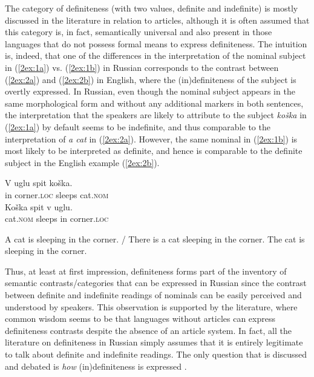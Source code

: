 \documentclass[output=paper]{langsci/langscibook}
\begin{document}
The category of definiteness (with two values, definite and indefinite) is mostly discussed in the literature in relation to articles, although it is often assumed that this category is, in fact, semantically universal and also present in those languages that do not possess formal means to express definiteness. The intuition is, indeed, that one of the differences in the interpretation of the nominal subject in (\ref{2ex:1a}) vs. (\ref{2ex:1b}) in Russian corresponds to the contrast between (\ref{2ex:2a}) and (\ref{2ex:2b}) in English, where the (in)definiteness of the subject is overtly expressed. In Russian, even though the nominal subject appears in the same morphological form and without any additional markers in both sentences, the interpretation that the speakers are likely to attribute to the subject {\emph{ko\v{s}ka}} in (\ref{2ex:1a}) by default seems to be indefinite, and thus comparable to the interpretation of {\emph{a cat}} in (\ref{2ex:2a}). However, the same nominal in (\ref{2ex:1b}) is most likely to be interpreted as definite, and hence is comparable to the definite subject in the English example (\ref{2ex:2b}).

\begin{exe}
\ex\label{2ex:1}
	\begin{xlista}
	\ex\label{2ex:1a}
	\gll V uglu spit ko\v{s}ka. \\
	in corner.{\textsc{loc}} sleeps cat.{\textsc{nom}} \\
	\glt 
	\ex\label{2ex:1b}
	\gll Ko\v{s}ka spit v uglu. \\
	cat.{\textsc{nom}} sleeps in corner.{\textsc{loc}} \\
	\glt 
	\end{xlista}
\ex\label{2ex:2}
	\begin{xlista}
	\ex\label{2ex:2a}
	A cat is sleeping in the corner. / There is a cat sleeping in the corner.
	\ex\label{2ex:2b}
	The cat is sleeping in the corner. 
	\end{xlista}
\end{exe}

Thus, at least at first impression, definiteness forms part of the inventory of semantic contrasts/categories that can be expressed in Russian since the contrast between definite and indefinite readings of nominals can be easily perceived and understood by speakers. This observation is supported by the literature, where common wisdom seems to be that languages without articles can express definiteness contrasts despite the absence of an article system. In fact, all the literature on definiteness in Russian simply assumes that it is entirely legitimate to talk about definite and indefinite readings. The only question that is discussed and debated is {\emph{how}} (in)definiteness is expressed \citep[see, for instance,][]{galkina:fedoruk:63,pospelov:70,krylov:84,nesset:99}.
\end{document}
